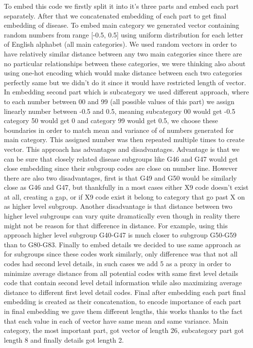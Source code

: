 To embed this code we firstly split it into it's three parts and embed each part separately. After that we concatenated embedding of each part to get final embedding of disease.
To embed main category we generated vector containing random numbers from range [-0.5, 0.5] using uniform distribution for each letter of English alphabet (all main categories). We used random vectors in order to have relatively similar distance between any two main categories since there are no particular relationships between these categories, we were thinking also about using one-hot encoding which would make distance between each two categories perfectly same but we didn't do it since it would have restricted length of vector. 
In embedding second part which is subcategory we used different approach, where to each number between 00 and 99 (all possible values of this part) we assign linearly number between -0.5 and 0.5, meaning subcategory 00 would get -0.5 category 50 would get 0 and category 99 would get 0.5, we choose these boundaries in order to match mean and variance of of numbers generated for main category. This assigned number was then repeated multiple times to create vector. This approach has advantages and disadvantages. Advantage is that we can be sure that closely related disease subgroups like G46 and G47 would get close embedding since their subgroup codes are close on number line. However there are also two disadvantages, first is that G49 and G50 would be similarly close as G46 and G47, but thankfully in a most cases either X9 code doesn't exist at all, creating a gap, or if X9 code exist it belong to category that go past X on as higher level subgroup. Another disadvantage is that distance between two higher level subgroups can vary quite dramatically even though in reality there might not be reason for that difference in distance. For example, using this approach higher level subgroup G40-G47 is much closer to subgroup G50-G59 than to G80-G83.
Finally to embed details we decided to use same approach as for subgroups since these codes work similarly, only difference was that not all codes had second level details, in such cases we add 5 as a proxy in order to minimize average distance from all potential codes with same first level details code that contain second level detail information while also maximizing average distance to different first level detail codes.
Final after embedding each part final embedding is created as their concatenation, to encode importance of each part in final embedding we gave them different lengths, this works thanks to the fact that each value in each of vector have same mean and same variance. Main category, the most important part, got vector of length 26, subcategory part got length 8 and finally details got length 2.
